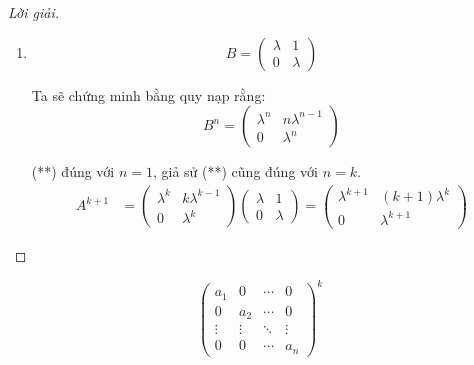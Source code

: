 \documentclass[class=linearalgebra,crop=false]{standalone}
\begin{document}
\begin{proof}[Lời giải]
\begin{enumerate}
        \item
            \[
                B =
                \begin{pmatrix}
                    \lambda & 1 \\
                    0       & \lambda
                \end{pmatrix}
            \]
            \par Ta sẽ chứng minh bằng quy nạp rằng:
            \[
                B^{n} =
                \begin{pmatrix}
                    \lambda^{n} & n\lambda^{n-1} \\
                    0           & \lambda^{n}
                \end{pmatrix}
                \tag{**}
            \]
            \par (**) đúng với $n=1$, giả sử (**) cũng đúng với $n = k$.
            \begin{align*}
                A^{k+1} & =
                \begin{pmatrix}
                    \lambda^{k} & k\lambda^{k-1} \\
                    0           & \lambda^{k}
                \end{pmatrix}
                \begin{pmatrix}
                    \lambda & 1       \\
                    0       & \lambda
                \end{pmatrix}
                =
                \begin{pmatrix}
                    \lambda^{k+1} & (k+1)\lambda^{k} \\
                    0             & \lambda^{k+1}
                \end{pmatrix}
            \end{align*}
    \end{enumerate}
\end{proof}

\begin{exercise}
    \[
        \begin{pmatrix}
             a_{1} & 0      & \cdots & 0      \\
                 0 & a_{2}  & \cdots & 0      \\
            \vdots & \vdots & \ddots & \vdots \\
                 0 & 0      & \cdots & a_{n}
        \end{pmatrix}^{k}
    \]
\end{exercise}
\end{document}
